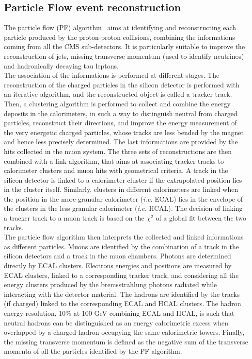 \subsection{Particle Flow event reconstruction}
The particle flow (PF) algorithm~\cite{Sirunyan:2270046} aims at identifying and reconstructing each particle produced by the proton-proton collisions, combining the informations coming from all the CMS sub-detectors. It is particularly suitable to improve the reconstruction of jets, missing transverse momentum (used to identify neutrinos) and hadronically decaying tau leptons.\\
The association of the informations is performed at different stages. The reconstruction of the charged particles in the silicon detector is performed with an iterative algorithm, and the reconstructed object is called a tracker track. Then, a clustering algorithm is performed to collect and combine the energy deposits in the calorimeters, in such a way to distinguish neutral from charged particles, reconstruct their directions, and improve the energy measurement of the very energetic charged particles, whose tracks are less bended by the magnet and hence less precisely determined. The last informations are provided by the hits collected in the muon system. The three sets of reconstructions are then combined with a link algorithm, that aims at associating tracker tracks to calorimeter clusters and muon hits with geometrical criteria. A track in the silicon detector is linked to a calorimeter cluster if the extrapolated position lies in the cluster itself. Similarly, clusters in different calorimeters are linked when the position in the more granular calorimeter (\textit{i.e.} ECAL) lies in the envelope of the clusters in the less granular calorimeter (\textit{i.e.} HCAL). The decision of linking a tracker track to a muon track is based on the $\chi^2$ of a global fit between the two tracks.\\
The particle flow algorithm then interprets the collected and linked informations as different particles. Muons are identified by the combination of a track in the silicon detectors and a track in the muon chambers. Photons are determined directly by ECAL clusters. Electrons energies and positions are measured by ECAL clusters, linked to a corresponding tracker track, and considering all the energy clusters produced by the bremsstrahlung photons radiated while interacting with the detector material. The hadrons are identified by the tracks (if charged) linked to the corresponding ECAL and HCAL clusters. The hadron energy resolution, 10\% at 100 GeV combining ECAL and HCAL, is such that neutral hadrons can be distinguished as an energy calorimetric excess when overlapped by a charged hadron occupying the same calorimetric towers. Finally, the missing transverse momentum is defined as the negative sum of the transverse momenta of all the particles identified by the PF algorithm.\\

